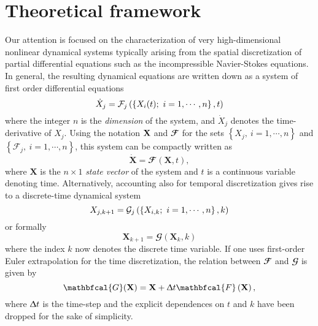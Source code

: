 \section{Theoretical framework}
\label{sec: theory}

  Our attention is focused on the characterization of very high-dimensional nonlinear dynamical systems typically arising from the spatial discretization of partial differential equations such as the incompressible Navier-Stokes equations. In general, the resulting dynamical equations are written down as a system of first order differential equations
  \begin{equation}
    \dot{X}_j = \mathcal{F}_j \left( \left\{ X_i(t);\ i =1, \cdots, n \right\}, t \right)
    \notag
  \end{equation}
  where the integer $n$ is the \emph{dimension} of the system, and $\dot{X}_j$ denotes the time-derivative of $X_j$. Using the notation $\bf{X}$ and $\mathbfcal{F}$ for the sets $\left\{ X_j,\ i =1, \cdots, n \right\}$ and $\left\{ \mathcal{F}_j,\ i =1, \cdots, n \right\}$, this system can be compactly written as
  \begin{equation}
    \dot{\mathbf{X}} = \mathbfcal{F}(\mathbf{X}, t),
    \label{eq: theory -- continuous-time dynamical system}
  \end{equation}
  where $\mathbf{X}$ is the $n \times 1$ \emph{state vector} of the system and $t$ is a continuous variable denoting time. Alternatively, accounting also for temporal discretization gives rise to a discrete-time dynamical system
  \begin{equation}
    X_{j, k+1} = \mathcal{G}_j \left( \left\{ X_{i, k};\ i = 1, \cdots, n \right\}, k \right)
    \notag
  \end{equation}
  or formally
  \begin{equation}
    \mathbf{X}_{k+1} = \mathbfcal{G} \left( \mathbf{X}_k, k \right)
    \label{eq: theory -- discrete-time dynamical system}
  \end{equation}
  where the index $k$ now denotes the discrete time variable. If one uses first-order Euler extrapolation for the time discretization, the relation between $\mathbfcal{F}$ and $\mathbfcal{G}$ is given by
  \begin{equation}
    \mathbfcal{G} (\mathbf{X}) = \mathbf{X} + \Updelta t \mathbfcal{F}\left( \mathbf{X} \right),
    \notag
  \end{equation}
  where $\Updelta t$ is the time-step and the explicit dependences on $t$ and $k$ have been dropped for the sake of simplicity.

